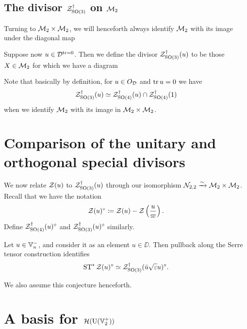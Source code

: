 \subsection{The divisor $\mathcal Z^{\dagger}_{\operatorname{SO}(3)}$ on $\mathcal M_2$}
Turning to $\mathcal M_2 \times \mathcal M_2$, we will henceforth always identify $\mathcal M_2$
with its image under the diagonal map
\begin{center}
\end{center}

\begin{definition}
  Suppose now $u \in \mathcal D^{\operatorname{tr} = 0}$.
  Then we define the divisor $\mathcal Z^{\dagger}_{\operatorname{SO}(3)}(u)$ to be those $X \in \mathcal M_2$
  for which we have a diagram
  \begin{center}
  \end{center}
  Note that basically by definition, for $u \in O_\mathcal D$ and $\operatorname{tr} u = 0$ we have
  \[ \mathcal Z^{\dagger}_{\operatorname{SO}(3)}(u) \simeq \mathcal Z^{\dagger}_{\operatorname{SO}(4)}(u) \cap \mathcal Z^{\dagger}_{\operatorname{SO}(4)}(1) \]
  when we identify $\mathcal M_2$ with its image in $\mathcal M_2 \times \mathcal M_2$.
\end{definition}

\section{Comparison of the unitary and orthogonal special divisors}
We now relate $\mathcal Z(u)$ to $\mathcal Z^{\dagger}_{\operatorname{SO}(3)}(u)$ through our
isomorphism $\mathcal N_{2,2} \xrightarrow{\sim} \mathcal M_2 \times \mathcal M_2$.
Recall that we have the notation
\[ \mathcal Z(u)^\circ \coloneqq \mathcal Z(u) - \mathcal Z\left( \frac{u}{\varpi} \right). \]
Define $\mathcal Z^{\dagger}_{\operatorname{SO}(4)}(u)^\circ$ and $\mathcal Z^{\dagger}_{\operatorname{SO}(3)}(u)^\circ$ similarly.

\begin{conjecture}
  \label{conj:serre_pullback_divisor}
  Let $u \in \mathbb V_n^-$, and consider it as an element $u \in \DD$.
  Then pullback along the Serre tensor construction identifies
  \[ \operatorname{ST}^\ast \mathcal Z(u)^\circ \simeq \mathcal Z^{\dagger}_{\operatorname{SO}(3)}(\bar u \sqrt{\varepsilon} u)^\circ. \]
\end{conjecture}
We also assume this conjecture henceforth.

\section{A basis for $\mathcal H(\operatorname{U}(\mathbb V_2^+))$}
\label{sec:hecke_unitary_basis}

